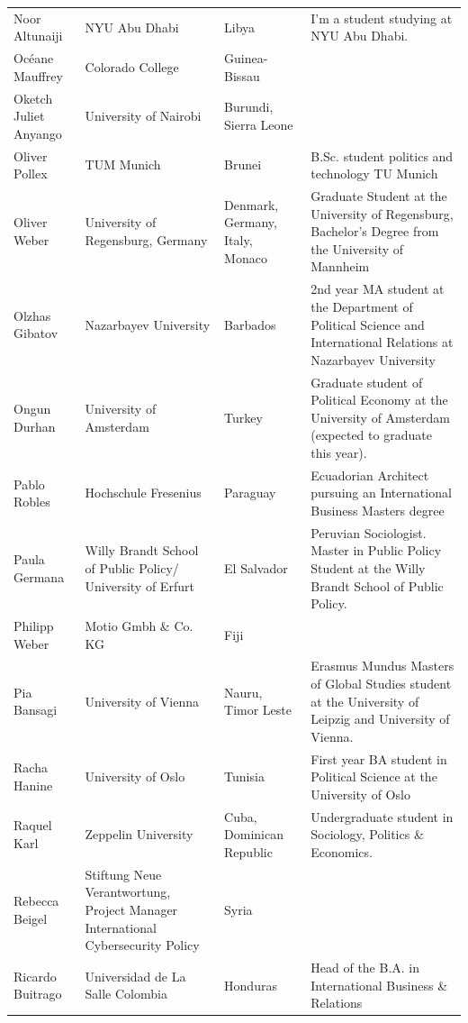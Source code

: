 \documentclass[]{article}
\begin{document}
\begin{longtable}{l>{\raggedright\arraybackslash}p{2cm}>{\raggedright\arraybackslash}p{2cm}>{\raggedright\arraybackslash}p{3cm}}
\addlinespace
\rowcolor{gray!6}  Noor Altunaiji & NYU Abu Dhabi & Libya & I'm a student studying at NYU Abu Dhabi.\\
Océane Mauffrey & Colorado College & Guinea-Bissau & \\
\rowcolor{gray!6}  Oketch Juliet Anyango & University of Nairobi & Burundi, Sierra Leone & \\
Oliver Pollex & TUM Munich & Brunei & B.Sc. student politics and technology TU Munich\\
\rowcolor{gray!6}  Oliver Weber & University of Regensburg, Germany & Denmark, Germany, Italy, Monaco & Graduate Student at the University of Regensburg, Bachelor's Degree from the University of Mannheim\\
\addlinespace
Olzhas Gibatov & Nazarbayev University & Barbados & 2nd year MA student at the Department of Political Science and International Relations at Nazarbayev University\\
\rowcolor{gray!6}  Ongun Durhan & University of Amsterdam & Turkey & Graduate student of Political Economy at the University of Amsterdam (expected to graduate this year).\\
Pablo Robles & Hochschule Fresenius & Paraguay & Ecuadorian Architect pursuing an International Business Masters degree\\
\rowcolor{gray!6}  Paula Germana & Willy Brandt School of Public Policy/ University of Erfurt & El Salvador & Peruvian Sociologist. Master in Public Policy Student at the Willy Brandt School of Public Policy.\\
Philipp Weber & Motio Gmbh \& Co. KG & Fiji & \\
\addlinespace
\rowcolor{gray!6}  Pia Bansagi & University of Vienna & Nauru, Timor Leste & Erasmus Mundus Masters of Global Studies student at the University of Leipzig and University of Vienna.\\
Racha Hanine & University of Oslo & Tunisia & First year BA student in Political Science at the University of Oslo\\
\rowcolor{gray!6}  Raquel Karl & Zeppelin University & Cuba, Dominican Republic & Undergraduate student in Sociology, Politics \& Economics.\\
Rebecca Beigel & Stiftung Neue Verantwortung, Project Manager International Cybersecurity Policy & Syria & \\
\rowcolor{gray!6}  Ricardo Buitrago & Universidad de La Salle Colombia & Honduras & Head of the B.A. in International Business \& Relations\\

\end{longtable}
\end{document}
